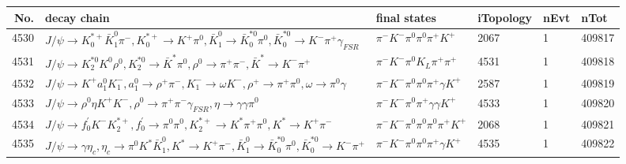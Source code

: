 \begin{table}[htbp] 
\begin{center}
\begin{small}
\begin{tabular}{rlllll}\hline\hline
 No. & decay chain & final states &  iTopology & nEvt & nTot \\\hline
4530&$J/\psi       \rightarrow K_{0}^{*+}     \bar{K}_1^{0} \pi^{-}        , K_{0}^{*+}      \rightarrow K^{+}          \pi^{0}        , \bar{K}_1^{0}  \rightarrow \bar{K}_0^{*0}\pi^{0}        , \bar{K}_0^{*0} \rightarrow K^{-}          \pi^{+}        \gamma_{FSR} $&$\pi^{-}        K^{-}          \pi^{0}        \pi^{0}        \pi^{+}        K^{+}          $& 2067&    1&409817\\
4531&$J/\psi       \rightarrow K_2^{*0}       K^{0}          \rho^{0}      , K_2^{*0}        \rightarrow \bar{K}^{*}   \pi^{0}        , \rho^{0}       \rightarrow \pi^{+}        \pi^{-}        , \bar{K}^{*}    \rightarrow K^{-}          \pi^{+}        $&$\pi^{-}        K^{-}          \pi^{0}        K_{L}          \pi^{+}        \pi^{+}        $& 4531&    1&409818\\
4532&$J/\psi       \rightarrow K^{+}          a_{1}^{0}      K_{1}^{-}      , a_{1}^{0}       \rightarrow \rho^{+}      \pi^{-}        , K_{1}^{-}       \rightarrow \omega         K^{-}          , \rho^{+}       \rightarrow \pi^{+}        \pi^{0}        , \omega          \rightarrow \pi^{0}        \gamma       $&$\pi^{-}        K^{-}          \pi^{0}        \pi^{0}        \pi^{+}        \gamma       K^{+}          $& 2587&    1&409819\\
4533&$J/\psi       \rightarrow \rho^{0}      \eta          K^{+}          K^{-}          , \rho^{0}       \rightarrow \pi^{+}        \pi^{-}        \gamma_{FSR} , \eta           \rightarrow \gamma       \gamma       \pi^{0}        $&$\pi^{-}        K^{-}          \pi^{0}        \pi^{+}        \gamma       \gamma       K^{+}          $& 4533&    1&409820\\
4534&$J/\psi       \rightarrow f^{'}_{0}     K^{-}          K_2^{*+}       , f^{'}_{0}      \rightarrow \pi^{0}        \pi^{0}        , K_2^{*+}        \rightarrow K^{*}          \pi^{+}        \pi^{0}        , K^{*}           \rightarrow K^{+}          \pi^{-}        $&$\pi^{-}        K^{-}          \pi^{0}        \pi^{0}        \pi^{0}        \pi^{+}        K^{+}          $& 2068&    1&409821\\
4535&$J/\psi       \rightarrow \gamma       \eta_{c}    , \eta_{c}     \rightarrow \pi^{0}        K^{*}          \bar{K}_1^{0} , K^{*}           \rightarrow K^{+}          \pi^{-}        , \bar{K}_1^{0}  \rightarrow \bar{K}_0^{*0}\pi^{0}        , \bar{K}_0^{*0} \rightarrow K^{-}          \pi^{+}        $&$\pi^{-}        K^{-}          \pi^{0}        \pi^{0}        \pi^{+}        \gamma       K^{+}          $& 4535&    1&409822\\

\end{tabular}
\end{small}
\end{center}
\end{table}
